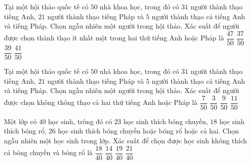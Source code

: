\begin{ex} %
	Tại một hội thảo quốc tế có $50$ nhà khoa học, trong đó có $31$ người thành thạo tiếng Anh, $21$ người thành thạo tiếng Pháp và $5$ người thành thạo cả tiếng Anh và tiếng Pháp. Chọn ngẫu nhiên một người trong hội thảo. Xác suất để người được chọn thành thạo ít nhất một trong hai thứ tiếng Anh hoặc Pháp là 
	\choice
	{\True$\dfrac{47}{50}$}
	{$\dfrac{37}{50}$}
	{$\dfrac{39}{50}$}
	{$\dfrac{41}{50}$}
\end{ex}
\begin{ex} %
	Tại một hội thảo quốc tế có $50$ nhà khoa học, trong đó có $31$ người thành thạo tiếng Anh, $21$ người thành thạo tiếng Pháp và $5$ người thành thạo cả tiếng Anh và tiếng Pháp. Chọn ngẫu nhiên một người trong hội thảo. Xác suất để người được chọn không thông thạo cả hai thứ tiếng Anh hoặc Pháp là 
	\choice
	{$\dfrac{7}{50}$}
	{\True$\dfrac{3}{50}$}
	{$\dfrac{9}{50}$}
	{$\dfrac{11}{50}$}
\end{ex}
\begin{ex}%
	Một lớp có $40$ học sinh, trông đó có $23$ học sinh thích bóng chuyền, $18$ học sinh thích bóng rổ, $26$ học sinh thích bóng chuyền hoặc bóng rổ hoặc cả hai. Chọn ngẫu nhiên một học sinh trong lớp. Xác suất để chọn được học sinh không thích cả bóng chuyền và bóng rổ là
	\choice
	{$\dfrac{18}{40}$} 
	{\True$\dfrac{14}{40}$} 
	{$\dfrac{19}{40}$} 
	{$\dfrac{21}{40}$}
\end{ex}

